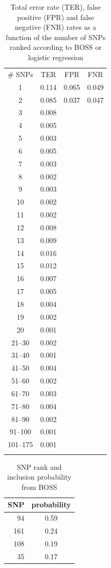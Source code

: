 \begin{table}
\caption{Total error rate (TER), false positive (FPR) and false negative
  (FNR) rates as a function of the number of SNPs ranked according to
  BOSS or logistic regression}
\label{tab:error}       %
\begin{tabular}{cccc}
\hline\noalign{\smallskip}
\# SNPs & TER & FPR & FNR \\
\noalign{\smallskip}\hline\noalign{\smallskip}
1 & 0.114 & 0.065 & 0.049 \\
2 & 0.085 & 0.037 & 0.047 \\
3 & 0.008 &  &  \\
4 & 0.005 &  &  \\
5 & 0.003 &  &  \\
6 & 0.005 &  &  \\
7 & 0.003 &  &  \\
8 & 0.002 &  &  \\
9 & 0.003 &  &  \\
10 & 0.002 &  &  \\
11 & 0.002 &  &  \\
12 & 0.008 &  &  \\
13 & 0.009 &  &  \\
14 & 0.016 &  &  \\
15 & 0.012 &  &  \\
16 & 0.007 &  &  \\
17 & 0.005 &  &  \\
18 & 0.004 &  &  \\
19 & 0.002 &  &  \\
20 & 0.001 &  &  \\
21--30 & 0.002  &  &  \\
31--40 & 0.001 &  &  \\
41--50 & 0.004 &  &  \\
51--60 & 0.002 &  &  \\
61--70 & 0.003 &  &  \\
71--80 & 0.004 &  &  \\
81--90 & 0.002 &  &  \\
91--100 & 0.001 &  &  \\
101--175 & 0.001 &  &  \\
\noalign{\smallskip}\hline
\end{tabular}
\end{table}

\begin{longtable}{rc}
\caption{SNP rank and inclusion probability from BOSS}
\label{tab:rank}\\
\hline
 SNP & probability \\ 
  \hline
 94 & 0.59 \\ 
  161 & 0.24 \\ 
  108 & 0.19 \\ 
   35 & 0.17 \\ 
  \hline
\end{longtable}


